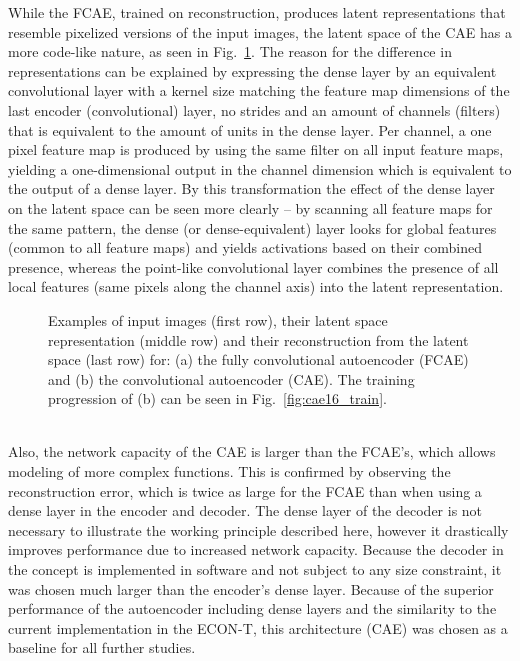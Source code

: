 \documentclass[../../main.tex]{subfiles}
\begin{document}
While the FCAE, trained on reconstruction, produces latent representations that resemble pixelized versions of the input images, the latent space of the CAE has a more code-like nature, as seen in Fig.~\ref{fig:CAE_expl}. The reason for the difference in representations can be explained by expressing the dense layer by an equivalent convolutional layer with a kernel size matching the feature map dimensions of the last encoder (convolutional) layer, no strides and an amount of channels (filters) that is equivalent to the amount of units in the dense layer. Per channel, a one pixel feature map is produced by using the same filter on all input feature maps, yielding a one-dimensional output in the channel dimension which is equivalent to the output of a dense layer. By this transformation the effect of the dense layer on the latent space can be seen more clearly -- by scanning all feature maps for the same pattern, the dense (or dense-equivalent) layer looks for global features (common to all feature maps) and yields activations based on their combined presence, whereas the point-like convolutional layer combines the presence of all local features (same pixels along the channel axis) into the latent representation.\\
\begin{figure}[htp]
	\begin{center}
		\hspace{4mm}
		\caption{Examples of input images (first row), their latent space representation (middle row) and their reconstruction from the latent space (last row) for: (a) the fully convolutional autoencoder (FCAE) and (b) the convolutional autoencoder (CAE). The training progression of (b) can be seen in Fig.~\ref{fig:cae16_train}.}
		\label{fig:CAE_expl}
	\end{center}
\end{figure}
\\
Also, the network capacity of the CAE is larger than the FCAE's, which allows modeling of more complex functions. This is confirmed by observing the reconstruction error, which is twice as large for the FCAE than when using a dense layer in the encoder and decoder. The dense layer of the decoder is not necessary to illustrate the working principle described here, however it drastically improves performance due to increased network capacity. Because the decoder in the concept is implemented in software and not subject to any size constraint, it was chosen much larger than the encoder's dense layer. Because of the superior performance of the autoencoder including dense layers and the similarity to the current implementation in the ECON-T, this architecture (CAE) was chosen as a baseline for all further studies.\\
\end{document}
